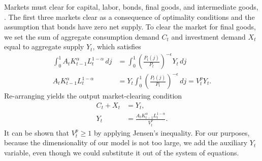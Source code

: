 \documentclass[12 pt, oneside]{article}
\theoremstyle{definition}
\theoremstyle{definition}
\theoremstyle{definition}
\begin{document}
Markets must clear for capital, labor, bonds, final goods, and intermediate goods, . The first three markets clear as a consequence of optimality conditions and the assumption that bonds have zero net supply. To clear the market for final goods, we set the sum of aggregate consumption demand $C_t$ and investment demand $X_t$ equal to aggregate supply $Y_t$, which satisfies
\begin{align*}
\int_0^1 A_t K_{t - 1}^\alpha L_t^{1 - \alpha}\, dj & = \int_0^1\left(\frac{P_t(j)}{P_t}\right)^{-\epsilon} Y_t\, dj\\
  A_tK_{t - 1}^\alpha L_t^{1 - \alpha} & = Y_t \int_0^1\left(\frac{P_t(j)}{P_t}\right)^{-\epsilon} \, dj = V_t^p Y_t.
\end{align*}
Re-arranging yields the output market-clearing condition
\begin{align}\label{eq:output market clearing}
  C_t + X_t & = Y_t,\\
  \label{eq:aggregate supply}
  Y_t & = \frac{A_t K_{t - 1}^{\alpha}L_t^{1 - \alpha}}{V_t^p}.
\end{align}
It can be shown that $V_t^p \geq 1$ by applying Jensen's inequality. For our purposes, because the dimensionality of our model is not too large, we add the auxiliary $Y_t$ variable, even though we could substitute it out of the system of equations.
\end{document}
